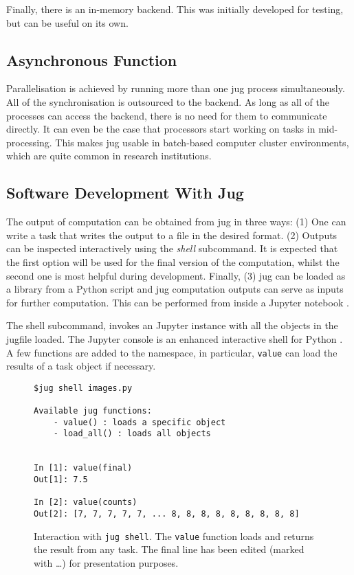 \documentclass{article}
\let\code\texttt
\begin{document}
Finally, there is an in-memory backend. This was initially developed for
testing, but can be useful on its own.

\subsection{Asynchronous Function}

Parallelisation is achieved by running more than one jug process
simultaneously. All of the synchronisation is outsourced to the backend. As
long as all of the processes can access the backend, there is no need for them
to communicate directly. It can even be the case that processors start working
on tasks in mid-processing. This makes jug usable in batch-based computer
cluster environments, which are quite common in research institutions.

\subsection{Software Development With Jug}

The output of computation can be obtained from jug in three ways: (1) One can
write a task that writes the output to a file in the desired format. (2)
Outputs can be inspected interactively using the \emph{shell} subcommand. It is
expected that the first option will be used for the final version of the
computation, whilst the second one is most helpful during development. Finally,
(3) jug can be loaded as a library from a Python script and jug computation
outputs can serve as inputs for further computation. This can be performed from
inside a Jupyter notebook \citep{kluyver2016jupyter}.

The shell subcommand, invokes an Jupyter instance with all the objects in the
jugfile loaded. The Jupyter console is an enhanced interactive shell for Python
\citep{perez2007ipython}. A few functions are added to the namespace, in
particular, \code{value} can load the results of a task object if necessary.

\begin{figure}
\begin{center}
\begin{verbatim}
$jug shell images.py

Available jug functions:
    - value() : loads a specific object
    - load_all() : loads all objects


In [1]: value(final)
Out[1]: 7.5

In [2]: value(counts)
Out[2]: [7, 7, 7, 7, 7, ... 8, 8, 8, 8, 8, 8, 8, 8, 8]
\end{verbatim}
\end{center}
\caption{Interaction with \code{jug shell}. The \code{value} function loads and
returns the result from any task. The final line has been edited (marked with
\ldots) for presentation purposes.}
\label{fig:jug-shell-interaction}
\end{figure}
\end{document}
